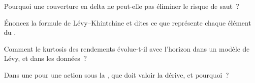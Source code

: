 \begin{interviewq}\label{iq:qm:jump-processes:3}
Pourquoi une couverture en delta ne peut-elle pas éliminer le risque de saut~?
\end{interviewq}

\begin{interviewq}\label{iq:qm:jump-processes:4}
Énoncez la formule de Lévy--Khintchine et dites ce que représente chaque élément du .
\end{interviewq}

\begin{interviewq}\label{iq:qm:jump-processes:5}
Comment le kurtosis des rendements évolue-t-il avec l'horizon dans un modèle de Lévy, et dans les données~?
\end{interviewq}

\begin{interviewq}\label{iq:qm:jump-processes:6}
Dans une  pour une action sous la , que doit valoir la dérive, et pourquoi~?
\end{interviewq}
